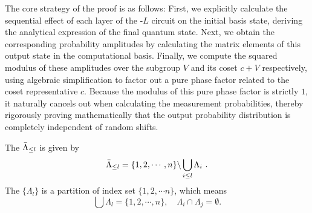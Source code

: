 The core strategy of the proof is as follows: First, we explicitly calculate the sequential effect of each layer of the \myqc-$L$ circuit on the initial basis state, deriving the analytical expression of the final quantum state. Next, we obtain the corresponding probability amplitudes by calculating the matrix elements of this output state in the computational basis. Finally, we compute the squared modulus of these amplitudes over the subgroup $V$ and its coset $c+V$ respectively, using algebraic simplification to factor out a pure phase factor related to the coset representative $c$. Because the modulus of this pure phase factor is strictly $1$, it naturally cancels out when calculating the measurement probabilities, thereby rigorously proving mathematically that the output probability distribution is completely independent of random shifts.

The $\bar{\Lambda}_{\leq l}$ is given by
\begin{equation}
    \bar{\Lambda}_{\leq l} = \{ 1,2, \cdots, n \} \backslash  \bigcup_{i \leq l} \Lambda_i ~.
\end{equation}
The $\{\Lambda_l\}$ is a partition of index set $\{1,2,\cdots n\}$, which means
\begin{equation}
    \bigcup  \Lambda_l =  \{ 1,2, \cdots, n \}, \quad \Lambda_i \cap \Lambda_j = \emptyset.
\end{equation}


